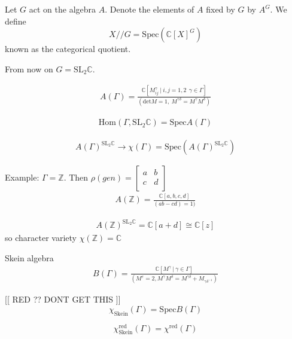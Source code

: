 Let $ G $ act on the algebra $ A$. 
Denote the elements of $A$ fixed by $G$ by $A^G$. 
We define 
\begin{equation}
    X//G = \mathrm{Spec}( \mathbb{C} [X] ^G) 
\end{equation}
known as the categorical quotient. 

From now on $G = \mathrm{SL}_2 \mathbb{C} $. 

\begin{align}
    A(\Gamma) = \frac{\mathbb{C} [ M ^\gamma _{ij} ~|~ i,j =1,2~~ \gamma \in \Gamma]}{(\mathrm{det}M = 1, ~ M^{\gamma \delta}=M^{\gamma} M^{\delta})}
\end{align}

\begin{align}
    \mathrm{Hom}(\Gamma, \mathrm{SL}_2 \mathbb{C} ) = \mathrm{Spec}A(\Gamma) 
\end{align}

\begin{align}
    A(\Gamma) ^{\mathrm{SL}_2 \mathbb{C} } \rightarrow \chi(\Gamma) = \mathrm{Spec}(A(\Gamma) ^{\mathrm{SL}_2 \mathbb{C} }) 
\end{align}

Example: 
$\Gamma = \mathbb{Z} $. 
Then $\rho(gen) = \left[ \begin{array}{rr} a & b \\ c & d \\ \end{array} \right]  $ 
\begin{align}
    A(\mathbb{Z} ) = \frac{\mathbb{C} [a,b,c,d] }{ (ab-cd)=1) } 
\end{align}

\begin{align}
    A(\mathbb{Z} ) ^{ \mathrm{SL}_2 \mathbb{C} } = \mathbb{C} [a+d] \cong \mathbb{C} [z]
\end{align}
so character variety $ \chi(\mathbb{Z} ) = \mathbb{C}  $

Skein algebra 
\begin{align}
    B(\Gamma) = \frac{\mathbb{C} [ M^\gamma ~|~ \gamma \in \Gamma] }{(M^e = 2, M^\gamma M^\delta = M^{\gamma \delta} + M_{\gamma \delta ^{-1}} )}
\end{align}

[[ RED ?? DONT GET THIS ]] 
    \begin{equation}
        \chi_{\mathrm{Skein}} (\Gamma) = \mathrm{Spec} B(\Gamma) 
    \end{equation}

\begin{theorem}
    \begin{equation}
        \chi_{\mathrm{Skein}} ^{\mathrm{red}} (\Gamma) =  \chi ^{\mathrm{red}} ( \Gamma) 
    \end{equation}
\end{theorem}


